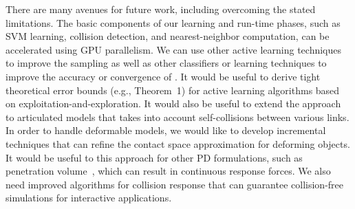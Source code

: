 There are many avenues for future work, including overcoming the stated limitations. The basic components of our learning and run-time phases, such as SVM learning, collision detection, and nearest-neighbor computation, can be accelerated using GPU parallelism. We can use other active learning techniques to improve the sampling as well as other classifiers or learning techniques to improve the accuracy or convergence of \LCS. It would be useful to derive tight theoretical error bounds (e.g., Theorem~1) for active learning algorithms based on exploitation-and-exploration.
It would also be useful to extend the approach to articulated models that takes into account self-collisions between various links.
In order to handle deformable models, we would like to develop incremental techniques that can refine the contact
space approximation for deforming objects. It would be useful to this approach for other PD formulations, such as penetration volume~\cite{Weller-RSS-09}, which can result in continuous response forces. We also need improved algorithms for collision response that can guarantee collision-free simulations for interactive applications.

